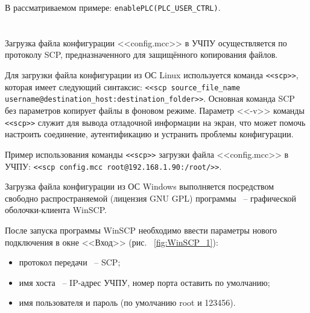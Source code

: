 В рассматриваемом примере: \texttt{enablePLC(PLC\_USER\_CTRL)}.


\section{}

Загрузка файла конфигурации <<config.mcc>> в УЧПУ осуществляется по протоколу SCP, предназначенного для защищённого копирования файлов.\killoverfullbefore \BL

Для загрузки файла конфигурации из ОС Linux используется команда \texttt{<<scp>>}, которая имеет следующий синтаксис: \texttt{<<scp source\_file\_name username@destination\_host:destination\_folder>>}. Основная команда SCP без параметров копирует файлы в фоновом режиме. Параметр <<-v>> команды \texttt{<<scp>>} служит для вывода отладочной информации на экран, что может помочь настроить соединение, аутентификацию и устранить проблемы конфигурации. \killoverfullbefore 

Пример использования команды \texttt{<<scp>>} загрузки файла <<config.mcc>> в УЧПУ: \newline \texttt{<<scp config.mcc root@192.168.1.90:/root/>>}. \killoverfullbefore \BL

Загрузка файла конфигурации из ОС Windows выполняется посредством свободно распространяемой (лицензия GNU GPL) программы ~-- графической оболочки-клиента WinSCP. \killoverfullbefore 


После запуска программы WinSCP необходимо ввести параметры нового подключения в окне <<Вход>> (рис. ~\ref{fig:WinSCP_1}):
\begin{itemize}
\item протокол передачи ~-- SCP;
\item имя хоста ~-- IP-адрес УЧПУ, номер порта оставить по умолчанию;
\item имя пользователя и пароль (по умолчанию root и 123456). \killoverfullbefore \BL
\end{itemize}

